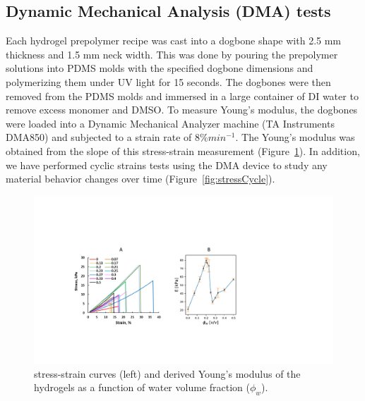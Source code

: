 \subsection{Dynamic Mechanical Analysis (DMA) tests}
Each hydrogel prepolymer recipe was cast into a dogbone shape with 2.5 mm thickness and 1.5 mm neck width. This was done by pouring the prepolymer solutions into PDMS molds with the specified dogbone dimensions and polymerizing them under UV light for 15 seconds. The dogbones were then removed from the PDMS molds and immersed in a large container of DI water to remove excess monomer and DMSO. To measure Young’s modulus, the dogbones were loaded into a Dynamic Mechanical Analyzer machine (TA Instruments DMA850) and subjected to a strain rate of $8\% min^{-1}$. The Young’s modulus was obtained from the slope of this stress-strain measurement (Figure~\ref{fig:DMA}). In addition, we have performed cyclic strains tests using the DMA device to study any material behavior changes over time (Figure~\ref{fig:stressCycle}).

\begin{figure}[!th]
      \centering
      \includegraphics[width=\textwidth]{DMA.pdf}
      \caption{stress-strain curves (left) and derived Young’s modulus of the hydrogels as a function of water volume fraction ($\phi_{w}$).}
      \label{fig:DMA}
\end{figure}


